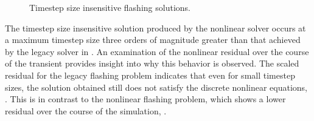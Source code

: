 \begin{figure}[h!t]
\centering
{}
\caption{Timestep size insensitive flashing solutions.}
\label{fig:flashing_res_comp_1}
\end{figure}

The timestep size insensitive solution produced by the nonlinear solver occurs at a maximum timestep size three orders of magnitude greater than that achieved by the legacy solver in \cobra{}.
An examination of the nonlinear residual over the course of the transient provides insight into why this behavior is observed.
The scaled residual for the legacy flashing problem indicates that even for small timestep sizes, the solution obtained still does not satisfy the discrete nonlinear equations, .
This is in contrast to the nonlinear flashing problem, which shows a lower residual over the course of the simulation, .

